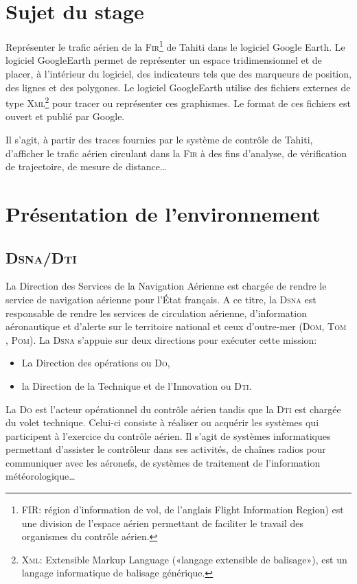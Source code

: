 \section{Sujet du stage}
Représenter le trafic aérien de la \textsc{Fir}\footnote{FIR: région d'information de vol, de l'anglais Flight Information Region) est une division de l'espace aérien permettant de faciliter le travail des organismes du contrôle aérien.} de Tahiti dans le logiciel Google Earth. Le logiciel GoogleEarth permet de représenter un espace tridimensionnel et de placer, à l’intérieur du logiciel, des indicateurs tels que des marqueurs de position, des lignes et des polygones. Le logiciel GoogleEarth utilise des fichiers externes de type \textsc{Xml}\footnote{\textsc{Xml}: Extensible Markup Language («langage extensible de balisage»), est un langage informatique de balisage générique.} pour tracer ou représenter ces graphismes. Le format de ces fichiers est ouvert et publié par Google. 

Il s’agit, à partir des traces fournies par le système de contrôle de Tahiti, d’afficher le trafic aérien circulant dans la \textsc{Fir} à des fins d’analyse, de vérification de trajectoire, de mesure de distance…

    
\section{Présentation de l’environnement}
    \subsection{\textsc{Dsna/Dti}}
La Direction des Services de la Navigation Aérienne est chargée de rendre le service de navigation aérienne pour l’État français. A ce titre, la \textsc{Dsna} est responsable de rendre les services de circulation aérienne, d’information aéronautique et d’alerte sur le territoire national et ceux d’outre-mer (\textsc{Dom, Tom , Pom}). La \textsc{Dsna} s’appuie sur deux directions pour exécuter cette mission:
\begin{itemize}
    \item La Direction des opérations ou \textsc{Do},
    \item la Direction de la Technique et de l’Innovation ou \textsc{Dti}.
\end{itemize}\medskip
La \textsc{Do} est l’acteur opérationnel du contrôle aérien tandis que la \textsc{Dti} est chargée du volet technique. Celui-ci consiste à réaliser ou acquérir les systèmes qui participent à l’exercice du contrôle aérien. Il s’agit de systèmes informatiques permettant d’assister le contrôleur dans ses activités, de chaînes radios pour communiquer avec les aéronefs, de systèmes de traitement de l’information météorologique…

